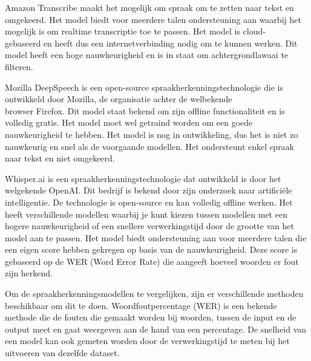 Amazon Transcribe maakt het mogelijk om spraak om te zetten naar tekst en omgekeerd. Het model biedt voor meerdere talen ondersteuning aan waarbij het mogelijk is om realtime transcriptie toe te passen. Het model is cloud-\\gebaseerd en heeft dus een internetverbinding nodig om te kunnen werken. Dit model heeft een hoge nauwkeurigheid en is in staat om achtergrondlawaai te filteren. \autocite{Kumbhar2023}

Mozilla DeepSpeech is een open-source spraakherkenningstechnologie die is ontwikkeld door Mozilla, de organisatie achter de welbekende \\browser Firefox. Dit model staat bekend om zijn offline functionaliteit en is volledig gratis. Het model moet wel getraind worden om een goede nauwkeurigheid te hebben. Het model is nog in ontwikkeling, dus het is niet zo nauwkeurig en snel als de voorgaande modellen. Het ondersteunt enkel spraak naar tekst en niet omgekeerd. \autocite{Tang2022}

Whisper.ai is een spraakherkenningstechnologie dat ontwikkeld is door het welgekende OpenAI. Dit bedrijf is bekend door zijn onderzoek naar artificiële intelligentie. De technologie is open-source en kan volledig offline werken. Het heeft verschillende modellen waarbij je kunt kiezen tussen modellen met een hogere nauwkeurigheid of een snellere verwerkingstijd door de grootte van het model aan te passen. Het model biedt ondersteuning aan voor meerdere talen die een eigen score hebben gekregen op basis van de nauwkeurigheid. Deze score is gebaseerd op de WER (Word Error Rate) die aangeeft hoeveel woorden er fout zijn herkend. \autocite{OpenAI2023}

Om de spraakherkenningsmodellen te vergelijken, zijn er verschillende methoden beschikbaar om dit te doen. Woordfoutpercentage (WER) is een bekende methode die de fouten die gemaakt worden bij woorden, tussen de input en de output meet en gaat weergeven aan de hand van een percentage. De snelheid van een model kan ook gemeten worden door de verwerkingstijd te meten bij het uitvoeren van dezelfde dataset.\\ \autocite{OConnor2023}



